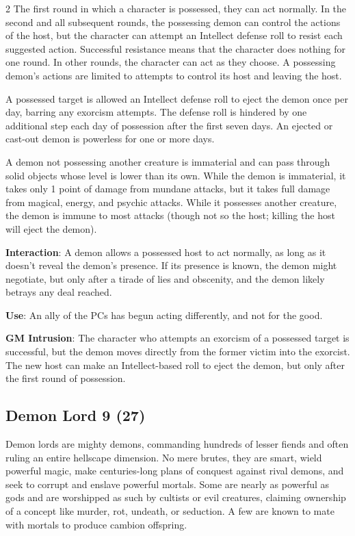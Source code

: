 \begin{multicols}{2}
The first round in which a character is possessed, they can act normally. In the second and all subsequent rounds, the possessing demon can control the actions of the host, but the character can attempt an Intellect defense roll to resist each suggested action. Successful resistance means that the character does nothing for one round. In other rounds, the character can act as they choose. A possessing demon’s actions are limited to attempts to control its host and leaving the host.

A possessed target is allowed an Intellect defense roll to eject the demon once per day, barring any exorcism attempts. The defense roll is hindered by one additional step each day of possession after the first seven days. An ejected or cast-out demon is powerless for one or more days.

A demon not possessing another creature is immaterial and can pass through solid objects whose level is lower than its own. While the demon is immaterial, it takes only 1 point of damage from mundane attacks, but it takes full damage from magical, energy, and psychic attacks. While it possesses another creature, the demon is immune to most attacks (though not so the host; killing the host will eject the demon).

\textbf{Interaction}: A demon allows a possessed host to act normally, as long as it doesn’t reveal the demon’s presence. If its presence is known, the demon might negotiate, but only after a tirade of lies and obscenity, and the demon likely betrays any deal reached.

\textbf{Use}: An ally of the PCs has begun acting differently, and not for the good.

\textbf{GM Intrusion}: The character who attempts an exorcism of a possessed target is successful, but the demon moves directly from the former victim into the exorcist. The new host can make an Intellect-based roll to eject the demon, but only after the first round of possession.

\subsection{Demon Lord 9 (27)}

Demon lords are mighty demons, commanding hundreds of lesser fiends and often ruling an entire hellscape dimension. No mere brutes, they are smart, wield powerful magic, make centuries-long plans of conquest against rival demons, and seek to corrupt and enslave powerful mortals. Some are nearly as powerful as gods and are worshipped as such by cultists or evil creatures, claiming ownership of a concept like murder, rot, undeath, or seduction. A few are known to mate with mortals to produce cambion offspring. 


\end{multicols}
